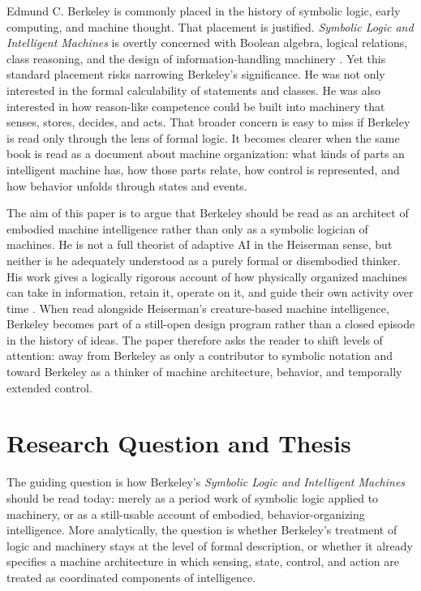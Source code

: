 \documentclass[11pt]{article}
\begin{document}
Edmund C. Berkeley is commonly placed in the history of symbolic logic, early computing, and machine thought. That placement is justified. \emph{Symbolic Logic and Intelligent Machines} is overtly concerned with Boolean algebra, logical relations, class reasoning, and the design of information-handling machinery \citep{berkeley1959symbolic}. Yet this standard placement risks narrowing Berkeley's significance. He was not only interested in the formal calculability of statements and classes. He was also interested in how reason-like competence could be built into machinery that senses, stores, decides, and acts. That broader concern is easy to miss if Berkeley is read only through the lens of formal logic. It becomes clearer when the same book is read as a document about machine organization: what kinds of parts an intelligent machine has, how those parts relate, how control is represented, and how behavior unfolds through states and events.

The aim of this paper is to argue that Berkeley should be read as an architect of embodied machine intelligence rather than only as a symbolic logician of machines. He is not a full theorist of adaptive AI in the Heiserman sense, but neither is he adequately understood as a purely formal or disembodied thinker. His work gives a logically rigorous account of how physically organized machines can take in information, retain it, operate on it, and guide their own activity over time \citep[pp.~66--70]{berkeley1959symbolic}. When read alongside Heiserman's creature-based machine intelligence, Berkeley becomes part of a still-open design program rather than a closed episode in the history of ideas. The paper therefore asks the reader to shift levels of attention: away from Berkeley as only a contributor to symbolic notation and toward Berkeley as a thinker of machine architecture, behavior, and temporally extended control.

\section{Research Question and Thesis}

The guiding question is how Berkeley's \emph{Symbolic Logic and Intelligent Machines} should be read today: merely as a period work of symbolic logic applied to machinery, or as a still-usable account of embodied, behavior-organizing intelligence. More analytically, the question is whether Berkeley's treatment of logic and machinery stays at the level of formal description, or whether it already specifies a machine architecture in which sensing, state, control, and action are treated as coordinated components of intelligence.
\end{document}
